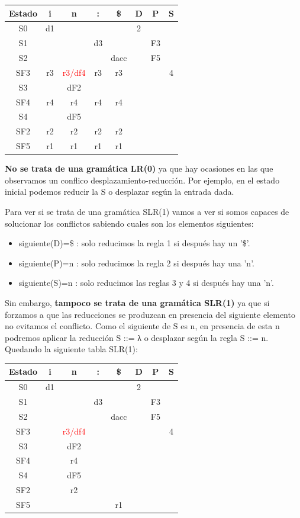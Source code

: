 \begin{problem}
\ppart
\begin{tabular}{| c | c | c | c | c | c | c | c | }
\hline
Estado & i & n & : & \$ & D & P & S\\
\hline
S0 & d1 & &  &  & 2 &  & \\
\hline
S1 &  &  & d3 &  &  & F3 & \\
\hline
S2 &  &  &  & dacc &  & F5 &\\
\hline
SF3 & r3 & \textcolor{red}{r3/df4} & r3 & r3 &  &  & 4\\
\hline
S3 &  & dF2 & &  &  &  & \\
\hline
SF4 & r4  & r4  & r4 & r4 & &  &\\
\hline
S4 &  & dF5 &  &  &  &  & \\
\hline
SF2 & r2 & r2 & r2 & r2 &  &  & \\
\hline
SF5 & r1 & r1 & r1 & r1 &  &  & \\
\hline
\end{tabular}
\ppart \textbf{No se trata de una gramática LR(0)} ya que hay ocasiones en las que observamos un conflico desplazamiento-reducción. Por ejemplo, en el estado inicial podemos reducir la S o desplazar según la entrada dada.

Para ver si se trata de una gramática SLR(1) vamos a ver si somos capaces de solucionar los conflictos sabiendo cuales son los elementos siguientes:
\begin{itemize}
\item siguiente(D)={\$} : solo reducimos la regla 1 si después hay un '\$'.
\item siguiente(P)={n} : solo reducimos la regla 2 si después hay una 'n'.
\item siguiente(S)={n} : solo reducimos las reglas 3 y 4 si después hay una 'n'.
\end{itemize}

Sin embargo, \textbf{tampoco se trata de una gramática SLR(1)} ya que si forzamos a que las reducciones se produzcan en presencia del siguiente elemento no evitamos el conflicto. Como el siguiente de S es n, en presencia de esta n podremos aplicar la reducción S ::= λ o desplazar según la regla S ::= n. Quedando la siguiente tabla SLR(1):

\begin{tabular}{| c | c | c | c | c | c | c | c | }
\hline
Estado & i & n & : & \$ & D & P & S\\
\hline
S0 & d1 & &  &  & 2 &  & \\
\hline
S1 &  &  & d3 &  &  & F3 & \\
\hline
S2 &  &  &  & dacc &  & F5 &\\
\hline
SF3 &  & \textcolor{red}{r3/df4} &  &  &  &  & 4\\
\hline
S3 &  & dF2 & &  &  &  & \\
\hline
SF4 &   & r4  &  &  & &  &\\
\hline
S4 &  & dF5 &  &  &  &  & \\
\hline
SF2 &  & r2 &  &  &  &  & \\
\hline
SF5 &  &  &  & r1  &  &  & \\
\hline
\end{tabular}

\end{problem}

